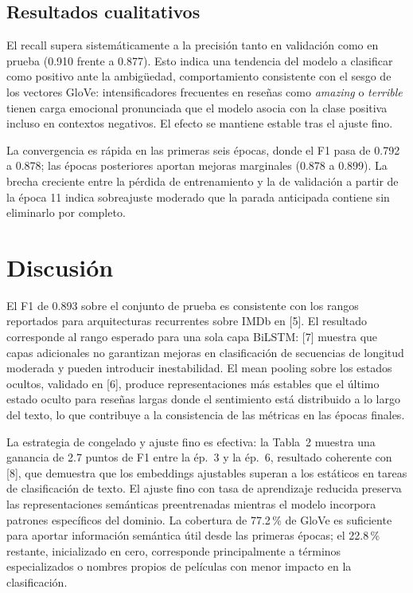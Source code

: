 \documentclass[letterpaper, 10pt, conference]{ieeeconf}
\begin{document}
\subsection{Resultados cualitativos}

El recall supera sistem\'aticamente a la precisi\'on tanto en validaci\'on como
en prueba (0.910 frente a 0.877). Esto indica una tendencia del modelo a
clasificar como positivo ante la ambig\"uedad, comportamiento consistente con
el sesgo de los vectores GloVe: intensificadores frecuentes en rese\~nas como
\textit{amazing} o \textit{terrible} tienen carga emocional pronunciada que el
modelo asocia con la clase positiva incluso en contextos negativos. El efecto
se mantiene estable tras el ajuste fino.

La convergencia es r\'apida en las primeras seis \'epocas, donde el F1 pasa
de 0.792 a 0.878; las \'epocas posteriores aportan mejoras marginales (0.878
a 0.899). La brecha creciente entre la p\'erdida de entrenamiento y la de
validaci\'on a partir de la \'epoca 11 indica sobreajuste moderado que la
parada anticipada contiene sin eliminarlo por completo.

\section{Discusi\'on}

El F1 de 0.893 sobre el conjunto de prueba es consistente con los rangos
reportados para arquitecturas recurrentes sobre IMDb en [5]. El resultado
corresponde al rango esperado para una sola capa BiLSTM: [7] muestra que
capas adicionales no garantizan mejoras en clasificaci\'on de secuencias de
longitud moderada y pueden introducir inestabilidad. El mean pooling sobre los
estados ocultos, validado en [6], produce representaciones m\'as estables que
el \'ultimo estado oculto para rese\~nas largas donde el sentimiento est\'a
distribuido a lo largo del texto, lo que contribuye a la consistencia de las
m\'etricas en las \'epocas finales.

La estrategia de congelado y ajuste fino es efectiva: la Tabla~2 muestra una
ganancia de 2.7 puntos de F1 entre la \'ep.~3 y la \'ep.~6, resultado
coherente con [8], que demuestra que los embeddings ajustables superan a los
est\'aticos en tareas de clasificaci\'on de texto. El ajuste fino con tasa de
aprendizaje reducida preserva las representaciones sem\'anticas preentrenadas
mientras el modelo incorpora patrones espec\'ificos del dominio. La cobertura
de 77.2\,\% de GloVe es suficiente para aportar informaci\'on sem\'antica
\'util desde las primeras \'epocas; el 22.8\,\% restante, inicializado en
cero, corresponde principalmente a t\'erminos especializados o nombres propios
de pel\'iculas con menor impacto en la clasificaci\'on.
\end{document}
